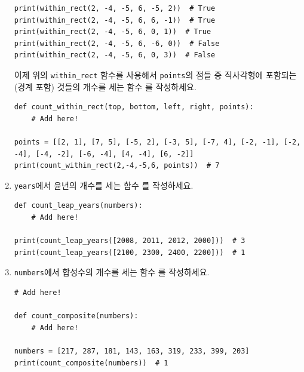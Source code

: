 \documentclass[../main.tex]{subfiles}
\begin{document}
\begin{enumerate}
\begin{verbatim}
print(within_rect(2, -4, -5, 6, -5, 2))  # True
print(within_rect(2, -4, -5, 6, 6, -1))  # True
print(within_rect(2, -4, -5, 6, 0, 1))  # True
print(within_rect(2, -4, -5, 6, -6, 0))  # False
print(within_rect(2, -4, -5, 6, 0, 3))  # False
\end{verbatim}

이제 위의 \verb/within_rect/ 함수를 사용해서 \verb/points/의 점들 중 직사각형에 포함되는 (경계 포함) 것들의 개수를 세는 함수 를 작성하세요.
\begin{verbatim}
def count_within_rect(top, bottom, left, right, points):
    # Add here!

points = [[2, 1], [7, 5], [-5, 2], [-3, 5], [-7, 4], [-2, -1], [-2, -4], [-4, -2], [-6, -4], [4, -4], [6, -2]]
print(count_within_rect(2,-4,-5,6, points))  # 7
\end{verbatim}

\item \verb/years/에서 윤년의 개수를 세는 함수 를 작성하세요.
\begin{verbatim}
def count_leap_years(numbers):
    # Add here!

print(count_leap_years([2008, 2011, 2012, 2000]))  # 3
print(count_leap_years([2100, 2300, 2400, 2200]))  # 1
\end{verbatim}

\item \verb/numbers/에서 합성수의 개수를 세는 함수 를 작성하세요.
\begin{verbatim}
# Add here!

def count_composite(numbers):
    # Add here!

numbers = [217, 287, 181, 143, 163, 319, 233, 399, 203]
print(count_composite(numbers))  # 1
\end{verbatim}
\end{enumerate}
\end{document}
